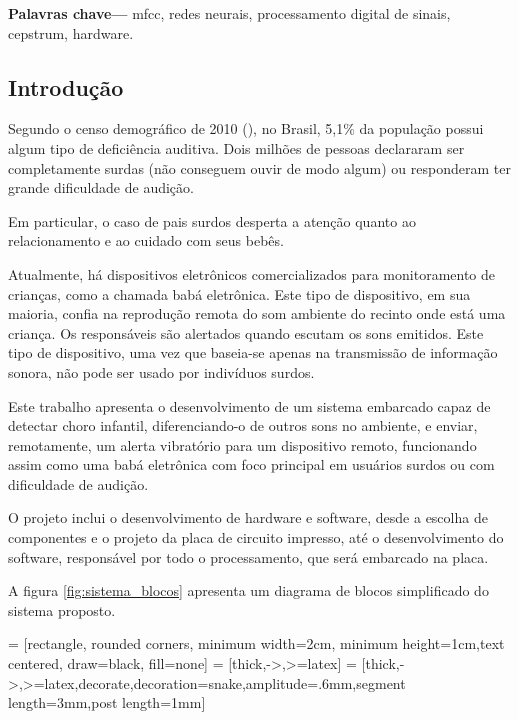 \documentclass[10pt,a4paper]{article}
\begin{document}
\vspace{0.35cm}
{\footnotesize \textbf{Palavras chave---} mfcc, redes neurais, processamento digital de sinais, cepstrum, hardware.}
\vspace{0.35cm}

\begin{multicols*}{2}

\section{Introdução}
Segundo o censo demográfico de 2010 (\cite{censo2010}), no Brasil, 5,1\% da população possui algum tipo de deficiência auditiva.  Dois milhões de pessoas declararam ser completamente surdas (não conseguem ouvir de modo algum) ou responderam ter grande dificuldade de audição.

Em particular, o caso de pais surdos desperta a atenção quanto ao relacionamento e ao cuidado com seus bebês.

Atualmente, há dispositivos eletrônicos comercializados para monitoramento de crianças, como a chamada babá eletrônica. Este tipo de dispositivo, em sua maioria, confia na reprodução remota do som ambiente do recinto onde está uma criança. Os responsáveis são alertados quando escutam os sons emitidos. Este tipo de dispositivo, uma vez que baseia-se apenas na transmissão de informação sonora, não pode ser usado por indivíduos surdos.

Este trabalho apresenta o desenvolvimento de um sistema embarcado capaz de detectar choro infantil, diferenciando-o de outros sons no ambiente, e enviar, remotamente, um alerta vibratório para um dispositivo remoto, funcionando assim como uma babá eletrônica com foco principal em usuários surdos ou com dificuldade de audição.

O projeto inclui o desenvolvimento de hardware e software, desde a escolha de componentes e o projeto da placa de circuito impresso, até o desenvolvimento do software, responsável por todo o processamento, que será embarcado na placa.

A figura \ref{fig:sistema_blocos} apresenta um diagrama de blocos simplificado do sistema proposto.


 = [rectangle, rounded corners, minimum width=2cm, minimum height=1cm,text centered, draw=black, fill=none]
 = [thick,->,>=latex]
 = [thick,->,>=latex,decorate,decoration={snake,amplitude=.6mm,segment length=3mm,post length=1mm}]



\end{multicols*}
\end{document}
